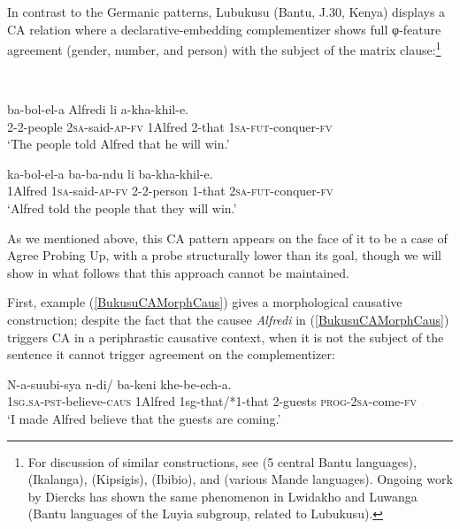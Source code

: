 \documentclass[output=paper
,modfonts
,nonflat
]{langsci/langscibook}
\begin{document}
In contrast to the Germanic patterns, Lubukusu (Bantu, J.30, Kenya) displays a CA relation where a declarative-embedding complementizer shows full φ-feature agreement (gender, number, and person) with the subject of the matrix clause:\footnote{For discussion of similar constructions, see \citet{Kawasha:2007} (5 central Bantu languages), \citet{LetsholoSafir:2017} (Ikalanga), \citet{DiercksRao:2017} (Kipsigis), \citet{Torrence:2016} (Ibibio), and \citet{Idiatov:2010} (various Mande languages). Ongoing work by Diercks has shown the same phenomenon in Lwidakho and Luwanga (Bantu languages of the Luyia subgroup, related to Lubukusu).}

\ea \label{FirstLubukusuExample}
 \\

\begin{xlist}

\ex
\gll {} ba-bol-el-a Alfredi li	a-kha-khil-e. \\
2-2-people 2\textsc{sa}-said-\textsc{ap}-\textsc{fv} 1Alfred 2-that 1\textsc{sa}-\textsc{fut}-conquer-\textsc{fv} \\
\glt `The people told Alfred that he will win.' 

\ex
\gll {} ka-bol-el-a ba-ba-ndu li ba-kha-khil-e. \\
1Alfred 1\textsc{sa}-said-\textsc{ap}-\textsc{fv} 2-2-person 1-that 2\textsc{sa}-\textsc{fut}-conquer-\textsc{fv} \\
\glt `Alfred told the people that they will win.'

\end{xlist}

\z

\noindent As we mentioned above, this CA pattern appears on the face of it to be a case of Agree Probing Up, with a probe structurally lower than its goal, though we will show in what follows that this approach cannot be maintained.

First, example (\ref{BukusuCAMorphCaus}) gives a morphological causative construction; despite the fact that the causee \textit{Alfredi} in (\ref{BukusuCAMorphCaus}) triggers CA in a periphrastic causative context, when it is not the subject of the sentence it cannot trigger agreement on the complementizer:

\ea \label{BukusuCAMorphCaus}
\gll N-a-suubi-sya  n-di/ ba-keni khe-be-ech-a. \\
1\textsc{sg}.\textsc{sa}-\textsc{pst}-believe-\textsc{caus} 1Alfred 1sg-that/*1-that 2-guests \textsc{prog}-2\textsc{sa}-come-\textsc{fv} \\
\glt `I made Alfred believe that the guests are coming.'
\z
\end{document}
